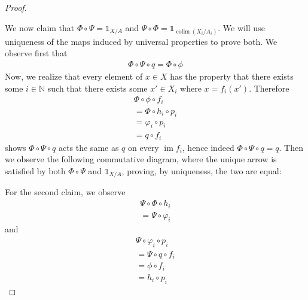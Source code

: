 \documentclass{article}
\newcommand{\N}{\mathbb{N}}
\newcommand{\altid}{\mathds{1}}
\DeclareMathOperator{\im}{\mathrm{im}}
\DeclareMathOperator{\colim}{\mathrm{colim}}
\begin{document}
\begin{proof}
    \begin{center}
    \end{center}
    We now claim that $\Phi\circ \Psi=\altid_{X/A}$ and $\Psi \circ \Phi=\altid_{\colim (X_i/A_i)}$. We will use uniqueness of the maps induced by universal properties to prove both. We observe first that
    \begin{align*}
        \Phi \circ \Psi \circ q=\Phi \circ \phi
    \end{align*}
    Now, we realize that every element of $x\in X$ has the property that there exists some $i\in \N$ such that there exists some $x'\in X_i$ where $x=f_i(x')$. Therefore 
    \begin{align*}
        \Phi \circ \phi \circ f_i\\
        =\Phi \circ h_i\circ p_i\\
        =\varphi_i \circ p_i\\
        =q\circ f_i
    \end{align*}
    shows $\Phi\circ \Psi\circ q$ acts the same as $q$ on every $\im f_i$, hence indeed $\Phi \circ \Psi \circ q=q$. Then we observe the following commutative diagram, where the unique arrow is satisfied by both $\Phi \circ \Psi$ and $\altid_{X/A}$, proving, by uniqueness, the two are equal:
    \begin{center}
    \end{center}
    For the second claim, we observe
    \begin{align*}
        \Psi \circ \Phi \circ h_i\\
        =\Psi \circ \varphi_i
    \end{align*}
    and
    \begin{align*}
        \Psi \circ \varphi_i \circ p_i\\
        =\Psi \circ q\circ f_i\\
        =\phi \circ f_i\\
        =h_i\circ p_i
    \end{align*}

\end{proof}
\end{document}
